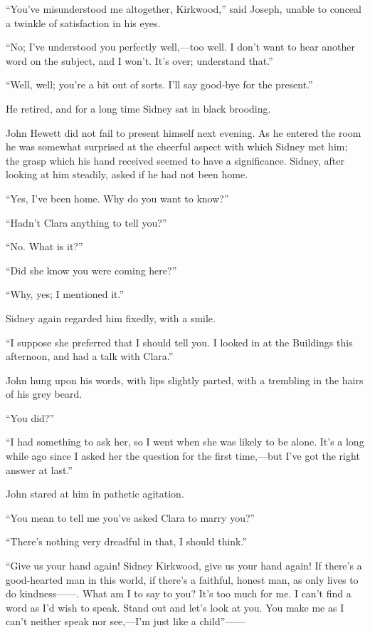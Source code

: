 ``You've misunderstood me altogether, Kirkwood,'' said Joseph, unable to
conceal a twinkle of satisfaction in his eyes.

``No; I've understood you perfectly well,---too well. I don't want to
hear another word on the subject, and I won't. It's over; understand
that.''

``Well, well; you're a bit out of sorts. I'll say good-bye for the
present.''

He retired, and for a long time Sidney sat in black brooding.

John Hewett did not fail to present {}himself next evening. As he
entered the room he was somewhat surprised at the cheerful aspect with
which Sidney met him; the grasp which his hand received seemed to have a
significance. Sidney, after looking at him steadily, asked if he had not
been home.

``Yes, I've been home. Why do you want to know?''

``Hadn't Clara anything to tell you?''

``No. What is it?''

``Did she know you were coming here?''

``Why, yes; I mentioned it.''

Sidney again regarded him fixedly, with a smile.

``I suppose she preferred that I should tell you. I looked in at the
Buildings this afternoon, and had a talk with Clara.''

John hung upon his words, with lips slightly parted, with a trembling in
the hairs of his grey beard.

``You did?''

``I had something to ask her, so I went when she was likely to be alone.
It's a long while ago since I asked her the question for the first
time,---but I've got the right answer at last.''

{}John stared at him in pathetic agitation.

``You mean to tell me you've asked Clara to marry you?''

``There's nothing very dreadful in that, I should think.''

``Give us your hand again! Sidney Kirkwood, give us your hand again! If
there's a good-hearted man in this world, if there's a faithful, honest
man, as only lives to do kindness{{------}}. What am I to say to you?
It's too much for me. I can't find a word as I'd wish to speak. Stand
out and let's look at you. You make me as I can't neither speak nor
see,---I'm just like a child''{{------}}

